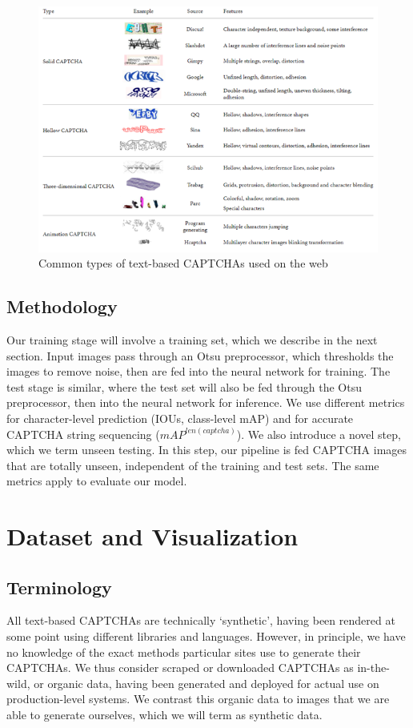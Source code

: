 \documentclass[twocolumn,10pt]{article}
\begin{document}
\begin{center}
\begin{figure}
  \includegraphics[width=\textwidth]{text_based_captcha.PNG}
  \caption{Common types of text-based CAPTCHAs used on the web}
  \label{fig:captchaexamples}
\end{figure}
\end{center}

\subsection{Methodology}
Our training stage will involve a training set, which we describe in the next section. Input images pass through an Otsu preprocessor, which thresholds the images to remove noise, then are fed into the neural network for training. The test stage is similar, where the test set will also be fed through the Otsu preprocessor, then into the neural network for inference. We use different metrics for character-level prediction (IOUs, class-level mAP) and for accurate CAPTCHA string sequencing ($mAP^{len(captcha)}$). We also introduce a novel step, which we term unseen testing. In this step, our pipeline is fed CAPTCHA images that are totally unseen, independent of the training and test sets. The same metrics apply to evaluate our model.

\section{Dataset and Visualization}
\subsection{Terminology}
All text-based CAPTCHAs are technically ‘synthetic’, having been rendered at some point using different libraries and languages. However, in principle, we have no knowledge of the exact methods particular sites use to generate their CAPTCHAs. We thus consider scraped or downloaded CAPTCHAs as in-the-wild, or organic data, having been generated and deployed for actual use on production-level systems. We contrast this organic data to images that we are able to generate ourselves, which we will term as synthetic data.
\end{document}
